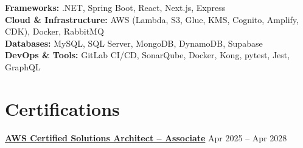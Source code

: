 \documentclass[10pt, a4paper]{article}
\begin{document}
\textbf{Frameworks:} .NET, Spring Boot, React, Next.js, Express \\

\textbf{Cloud \& Infrastructure:}  AWS (Lambda, S3, Glue, KMS, Cognito, Amplify, CDK), Docker, RabbitMQ \\

\textbf{Databases:} MySQL, SQL Server, MongoDB, DynamoDB, Supabase \\

\textbf{DevOps \& Tools:} GitLab CI/CD, SonarQube, Docker, Kong, pytest, Jest, GraphQL

\section{Certifications}

\textbf{\href{https://www.credly.com/badges/95267b1a-fc80-4af4-b35b-1c865d6dc534/linked_in_profile}{AWS Certified Solutions Architect -- Associate}} \hfill Apr 2025 – Apr 2028
\end{document}
